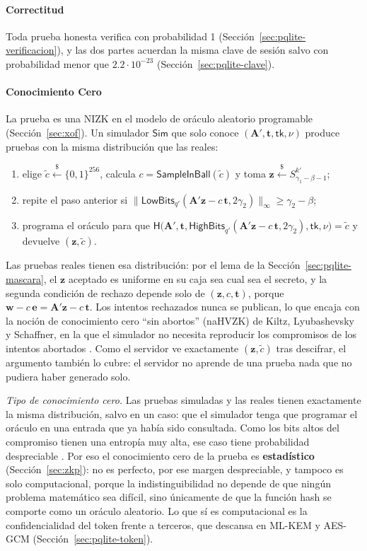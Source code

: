 \paragraph{Correctitud}
Toda prueba honesta verifica con probabilidad 1 (Sección~\ref{sec:pqlite-verificacion}), y las dos partes acuerdan la misma clave de sesión salvo con probabilidad menor que $2.2 \cdot 10^{-23}$ (Sección~\ref{sec:pqlite-clave}).

\paragraph{Conocimiento Cero}
La prueba es una NIZK en el modelo de oráculo aleatorio programable (Sección~\ref{sec:xof}). Un simulador $\mathsf{Sim}$ que solo conoce $(\mathbf{A}', \mathbf{t}, \mathsf{tk}, \nu)$ produce pruebas con la misma distribución que las reales:
\begin{enumerate}
    \item elige $\tilde{c} \xleftarrow{\$} \{0,1\}^{256}$, calcula $c = \mathsf{SampleInBall}(\tilde{c})$ y toma $\mathbf{z} \xleftarrow{\$} S_{\gamma_1-\beta-1}^{k'}$;
    \item repite el paso anterior si $\|\mathsf{LowBits}_{q'}(\mathbf{A}'\mathbf{z} - c\,\mathbf{t}, 2\gamma_2)\|_\infty \ge \gamma_2 - \beta$;
    \item programa el oráculo para que $\mathsf{H}\big(\mathbf{A}', \mathbf{t}, \mathsf{HighBits}_{q'}(\mathbf{A}'\mathbf{z} - c\,\mathbf{t}, 2\gamma_2), \mathsf{tk}, \nu\big) = \tilde{c}$ y devuelve $(\mathbf{z}, \tilde{c})$.
\end{enumerate}
Las pruebas reales tienen esa distribución: por el lema de la Sección~\ref{sec:pqlite-mascara}, el $\mathbf{z}$ aceptado es uniforme en su caja sea cual sea el secreto, y la segunda condición de rechazo depende solo de $(\mathbf{z}, c, \mathbf{t})$, porque $\mathbf{w} - c\,\mathbf{e} = \mathbf{A}'\mathbf{z} - c\,\mathbf{t}$. Los intentos rechazados nunca se publican, lo que encaja con la noción de conocimiento cero ``sin abortos'' (naHVZK) de Kiltz, Lyubashevsky y Schaffner, en la que el simulador no necesita reproducir los compromisos de los intentos abortados \cite{kiltz2018concrete}. Como el servidor ve exactamente $(\mathbf{z}, \tilde{c})$ tras descifrar, el argumento también lo cubre: el servidor no aprende de una prueba nada que no pudiera haber generado solo.

\textit{Tipo de conocimiento cero.} Las pruebas simuladas y las reales tienen exactamente la misma distribución, salvo en un caso: que el simulador tenga que programar el oráculo en una entrada que ya había sido consultada. Como los bits altos del compromiso tienen una entropía muy alta, ese caso tiene probabilidad despreciable \cite{bai2021dilithium}. Por eso el conocimiento cero de la prueba es \textbf{estadístico} (Sección~\ref{sec:zkp}): no es perfecto, por ese margen despreciable, y tampoco es solo computacional, porque la indistinguibilidad no depende de que ningún problema matemático sea difícil, sino únicamente de que la función hash se comporte como un oráculo aleatorio. Lo que sí es computacional es la confidencialidad del token frente a terceros, que descansa en ML-KEM y AES-GCM (Sección~\ref{sec:pqlite-token}).

